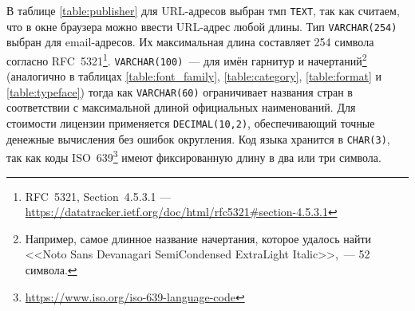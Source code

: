 В таблице \ref{table:publisher} для URL-адресов выбран тмп \texttt{TEXT}, так как считаем, что в окне браузера можно ввести URL-адрес любой длины. Тип \texttt{VARCHAR(254)} выбран для email-адресов. Их максимальная длина составляет 254 символа согласно RFC~5321\footnote{RFC~5321, Section~4.5.3.1 --- \url{https://datatracker.ietf.org/doc/html/rfc5321\#section-4.5.3.1}}. \texttt{VARCHAR(100)}~--- для имён гарнитур и начертаний\footnote{Например, самое длинное название начертания, которое удалось найти <<Noto Sans Devanagari SemiCondensed ExtraLight Italic>>,~--- 52 символа.} (аналогично в таблицах \ref{table:font_family}, \ref{table:category}, \ref{table:format} и \ref{table:typeface}) тогда как \texttt{VARCHAR(60)} ограничивает названия стран в соответствии с максимальной длиной официальных наименований. Для стоимости лицензии применяется \texttt{DECIMAL(10,2)}, обеспечивающий точные денежные вычисления без ошибок округления. Код языка хранится в \texttt{CHAR(3)}, так как коды ISO~639\footnote{\url{https://www.iso.org/iso-639-language-code}} имеют фиксированную длину в два или три символа.


